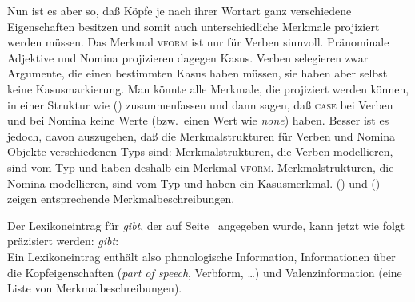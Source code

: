 \ea
\z
Nun ist es aber so, daß Köpfe je nach ihrer Wortart ganz verschiedene Eigenschaften
besitzen und somit auch unterschiedliche Merkmale projiziert werden müssen.
Das Merkmal \textsc{vform} ist nur für Verben sinnvoll. Pränominale Adjektive und 
Nomina projizieren dagegen Kasus. Verben selegieren zwar Argumente, die einen
bestimmten Kasus haben müssen, sie haben aber selbst keine Kasusmarkierung.
Man könnte alle Merkmale, die projiziert werden können, in einer Struktur wie
() zusammenfassen und dann sagen, daß \textsc{case} bei Verben und \vform
bei Nomina keine Werte (bzw.\ einen Wert wie \emph{none}) haben.
\ea
\z
Besser ist es jedoch, davon auszugehen, daß die Merkmalstrukturen für
Verben und Nomina Objekte verschiedenen Typs sind: Merkmalstrukturen,
die Verben modellieren, sind vom Typ  und haben deshalb
ein Merkmal \textsc{vform}. Merkmalstrukturen, die Nomina modellieren,
sind vom Typ  und haben ein
Kasusmerkmal\label{page-ref-case-feat}. () und () zeigen entsprechende
Merkmalbeschreibungen.
\ea
{}
\z
\ea
\z

\noindent
Der Lexikoneintrag für \emph{gibt}, der auf Seite~\pageref{le-gibt-1}
angegeben wurde, kann jetzt wie folgt präzisiert werden:
\ea
\textit{gibt\/}:\\
\z
Ein Lexikoneintrag enthält also phonologische Information, Informationen über die Kopfeigenschaften (\emph{part of speech}, Verbform, \ldots)
und Valenzinformation (eine Liste von Merkmalbeschreibungen).

